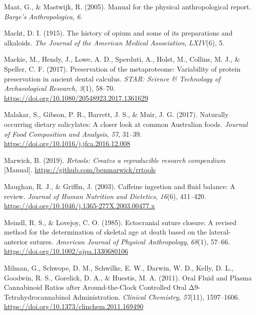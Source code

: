 \documentclass[
]{article}
\newlength{\cslhangindent}
\newlength{\cslentryspacingunit} %
\newenvironment{CSLReferences}[2] %
 {%
  \setlength{\parindent}{0pt}
  \ifodd #1
  \let\oldpar\par
  \def\par{\hangindent=\cslhangindent\oldpar}
  \fi
  \setlength{\parskip}{#2\cslentryspacingunit}
 }%
 {}
\begin{document}
\begin{CSLReferences}{1}{0}
\leavevmode{}%
Maat, G., \& Mastwijk, R. (2005). Manual for the physical
anthropological report. \emph{Barge's Anthropologica}, \emph{6}.

\leavevmode{}%
Macht, D. I. (1915). The history of opium and some of its preparations
and alkaloids. \emph{The Journal of the American Medical Association},
\emph{LXIV}(6), 5.

\leavevmode{}%
Mackie, M., Hendy, J., Lowe, A. D., Sperduti, A., Holst, M., Collins, M.
J., \& Speller, C. F. (2017). Preservation of the metaproteome:
Variability of protein preservation in ancient dental calculus.
\emph{STAR: Science \& Technology of Archaeological Research},
\emph{3}(1), 58--70. \url{https://doi.org/10.1080/20548923.2017.1361629}

\leavevmode{}%
Malakar, S., Gibson, P. R., Barrett, J. S., \& Muir, J. G. (2017).
Naturally occurring dietary salicylates: {A} closer look at common
{Australian} foods. \emph{Journal of Food Composition and Analysis},
\emph{57}, 31--39. \url{https://doi.org/10.1016/j.jfca.2016.12.008}

\leavevmode{}%
Marwick, B. (2019). \emph{Rrtools: {Creates} a reproducible research
compendium} {[}Manual{]}. \url{https://github.com/benmarwick/rrtools}

\leavevmode{}%
Maughan, R. J., \& Griffin, J. (2003). Caffeine ingestion and fluid
balance: A review. \emph{Journal of Human Nutrition and Dietetics},
\emph{16}(6), 411--420.
\url{https://doi.org/10.1046/j.1365-277X.2003.00477.x}

\leavevmode{}%
Meindl, R. S., \& Lovejoy, C. O. (1985). Ectocranial suture closure: {A}
revised method for the determination of skeletal age at death based on
the lateral-anterior sutures. \emph{American Journal of Physical
Anthropology}, \emph{68}(1), 57--66.
\url{https://doi.org/10.1002/ajpa.1330680106}

\leavevmode{}%
Milman, G., Schwope, D. M., Schwilke, E. W., Darwin, W. D., Kelly, D.
L., Goodwin, R. S., Gorelick, D. A., \& Huestis, M. A. (2011). Oral
{Fluid} and {Plasma Cannabinoid Ratios} after {Around-the-Clock
Controlled Oral Δ9-Tetrahydrocannabinol Administration}. \emph{Clinical
Chemistry}, \emph{57}(11), 1597--1606.
\url{https://doi.org/10.1373/clinchem.2011.169490}


\end{CSLReferences}
\end{document}

